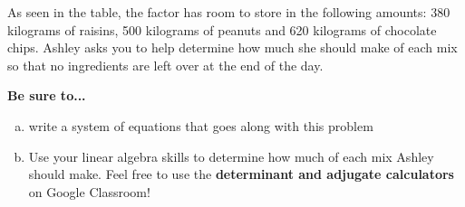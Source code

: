 \documentclass{exam}
\begin{document}
\begin{questions}
As seen in the table, the factor has room to store in the following amounts: 380 kilograms of raisins, 500 kilograms of peanuts and 620 kilograms of chocolate chips.    Ashley asks you  to help determine how much she should make of each mix so that no ingredients are left over at the end of the day.

\textbf{Be sure to...}
\begin{enumerate}[a.]
\item write a system of equations that goes along with this problem
\item Use your linear algebra skills to determine how much of each mix Ashley should make. Feel free to use the  \textbf{determinant and adjugate calculators} on Google Classroom!
\end{enumerate}

\end{questions}
\end{document}
